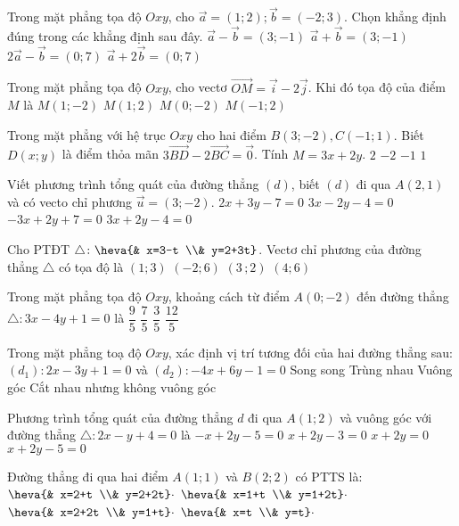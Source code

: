 \begin{ex}
Trong mặt phẳng tọa độ $Oxy$, cho $\vec{a}=(1;2);\vec{b}=(-2;3)$. Chọn khẳng định đúng trong các khẳng định sau đây.
\choice
{$\vec{a}-\vec{b}=(3;-1)$}
{$\vec{a}+\vec{b}=(3;-1)$}
{$2\vec{a}-\vec{b}=(0;7)$}
{$\vec{a}+2\vec{b}=(0;7)$}
\end{ex}
\begin{ex}
Trong mặt phẳng tọa độ $Oxy$, cho vectơ $\vec{OM}=\vec{i}-2\vec{j}$. Khi đó tọa độ của điểm $M$ là
\choice
{$M(1;-2)$}
{$M(1;2)$}
{$M(0;-2)$}
{$M(-1;2)$}
\end{ex}
\begin{ex}
Trong mặt phẳng với hệ trục $Oxy$ cho hai điểm $B(3;-2),C(-1;1)$. Biết $D(x;y)$ là điểm thỏa mãn $3\vec{BD}-2\vec{BC}=\vec{0}$. Tính $M=3x+2y$.
\choice
{$2$}
{$-2$}
{$-1$}
{$1$}
\end{ex}
\begin{ex}
Viết phương trình tổng quát của đường thẳng $(d)$, biết $(d)$ đi qua $A\left(2{,}1\right)$ và có vecto chỉ phương $\vec{u}=(3;-2)$.
\choice
{$2x+3y-7=0$}
{$3x-2y-4=0$}
{$-3x+2y+7=0$}
{$3x+2y-4=0$}
\end{ex}
\begin{ex}
Cho PTĐT $\triangle \colon \heva{& x=3-t \\& y=2+3t}$. Vectơ chỉ phương của đường thẳng $\triangle $ có tọa độ là
\choice
{$(1;3)$}
{$(-2;6)$}
{$\left(3\,;2\right)$}
{$(4;6)$}
\end{ex}
\begin{ex}
Trong mặt phẳng tọa độ $Oxy$, khoảng cách từ điểm $A(0;-2)$ đến đường thẳng $\triangle \colon 3x-4y+1=0$ là
\choice
{$\dfrac{9}{5}$}
{$\dfrac{7}{5}$}
{$\dfrac{3}{5}$}
{$\dfrac{12}{5}$}
\end{ex}
\begin{ex}
Trong mặt phẳng toạ độ $Oxy$, xác định vị trí tương đối của hai đường thẳng sau: $\left(d_1\right)\colon 2x-3y+1=0$ và $\left(d_2\right)\colon -4x+6y-1=0$
\choice
{Song song}
{Trùng nhau}
{Vuông góc}
{Cắt nhau nhưng không vuông góc}
\end{ex}
\begin{ex}
Phương trình tổng quát của đường thẳng $d$ đi qua $A(1;2)$ và vuông góc với đường thẳng $\triangle \colon 2x-y+4=0$ là
\choice
{$-x+2y-5=0$}
{$x+2y-3=0$}
{$x+2y=0$}
{$x+2y-5=0$}
\end{ex}
\begin{ex}
Đường thẳng đi qua hai điểm $A(1;1)$ và $B(2;2)$ có PTTS là:
\choice
{$\heva{& x=2+t \\& y=2+2t}\cdot $}
{$\heva{& x=1+t \\& y=1+2t}\cdot $}
{$\heva{& x=2+2t \\& y=1+t}\cdot $}
{$\heva{& x=t \\& y=t}\cdot $}
\end{ex}
